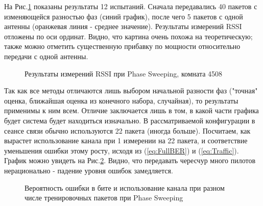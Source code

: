 \documentclass[a4paper,12pt,oneside]{scrartcl}
\begin{document}
На Рис.\ref{fig:4508} показаны результаты 12 испытаний. 
Сначала передавались 40 пакетов с изменяющейся разностью фаз (синий график), после чего 5 пакетов с одной антенны (оранжевая линия - среднее значение). 
Результаты измерений RSSI отложены по оси ординат. 
Видно, что картина очень похожа на теоретическую; также можно отметить существенную прибавку по мощности относительно передачи с одной антенны.
\begin{figure}[H]
\caption{Результаты измерений RSSI при Phase Sweeping, комната 4508}
\label{fig:4508}
\end{figure}

Так как все методы отличаются лишь выбором начальной разности фаз ("точная" оценка, ближайшая оценка из конечного набора, случайная), то результаты применимы к ним всем. Отличие заключается лишь в том, в какой части графика будет система будет находиться изначально.
В рассматриваемой конфигурации в сеансе связи обычно используются 22 пакета (иногда больше). 
Посчитаем, как вырастет использование канала при 1 измерении на 22 пакета, и соответствие уменьшения ошибки этому росту, исходя из (\ref{eq:FullBER}) и (\ref{eq:Traffic}). 
График можно увидеть на Рис.\ref{fig:BERvsChannel}. Видно, что передавать чересчур много пилотов нерационально - падение уровня ошибок замедляется.

\begin{figure}[h!]
\caption{Вероятность ошибки в бите и использование канала при разном числе тренировочных пакетов при Phase Sweeping}
\label{fig:BERvsChannel}
\end{figure}
\end{document}
